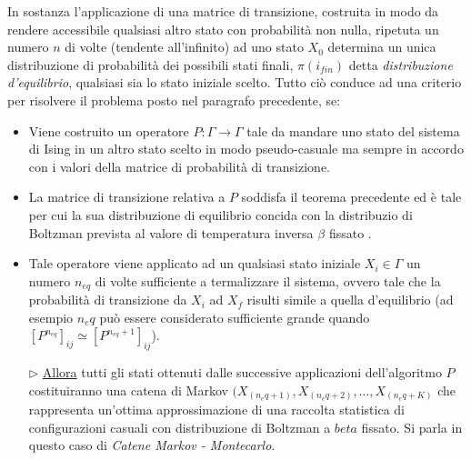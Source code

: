 In sostanza l'applicazione di una matrice di transizione, costruita in modo da rendere accessibile qualsiasi altro stato con probabilità non nulla, ripetuta un numero $n$ di volte (tendente all'infinito) ad uno stato $X_0$ determina un unica distribuzione di probabilità dei possibili stati finali, $\pi(i_{fin})$ detta \emph{distribuzione d'equilibrio}, qualsiasi sia lo stato iniziale scelto.
\bigskip \newline
Tutto ciò conduce ad una criterio per risolvere il problema posto nel paragrafo precedente, se:
\begin{itemize}

\item Viene costruito un operatore $P: \Gamma \rightarrow \Gamma$ tale da mandare uno stato del sistema di Ising in un altro stato scelto in modo pseudo-casuale ma sempre in accordo con i valori della matrice di probabilità di transizione.
 
\item La matrice di transizione relativa a $P$ soddisfa il teorema precedente ed è tale per cui la sua distribuzione di equilibrio concida con la distribuzio di Boltzman prevista al valore di temperatura inversa $\beta$ fissato .

\item Tale operatore viene applicato ad un qualsiasi stato iniziale $X_i \in \Gamma$ un numero $n_{eq}$ di volte sufficiente a termalizzare il sistema, ovvero tale che la probabilità di transizione da $X_i$ ad $X_f$ risulti simile a quella d'equilibrio (ad esempio $n_eq$ può essere considerato sufficiente grande quando   $[P^{n_{eq}}]_{ij} \simeq [P^{n_{eq}+1}]_{ij}$).

\item[$\triangleright$] \underline{Allora} tutti gli stati ottenuti dalle successive applicazioni dell'algoritmo $P$ costituiranno una catena di Markov $(X_{(n_eq + 1)}, X_{(n_eq + 2)}, \ldots, X_{(n_eq + K)}$ che rappresenta un'ottima approssimazione di una raccolta statistica di configurazioni casuali con distribuzione di Boltzman a $beta$ fissato.\newline
Si parla in questo caso di \emph{Catene Markov - Montecarlo}.

\end{itemize} 

